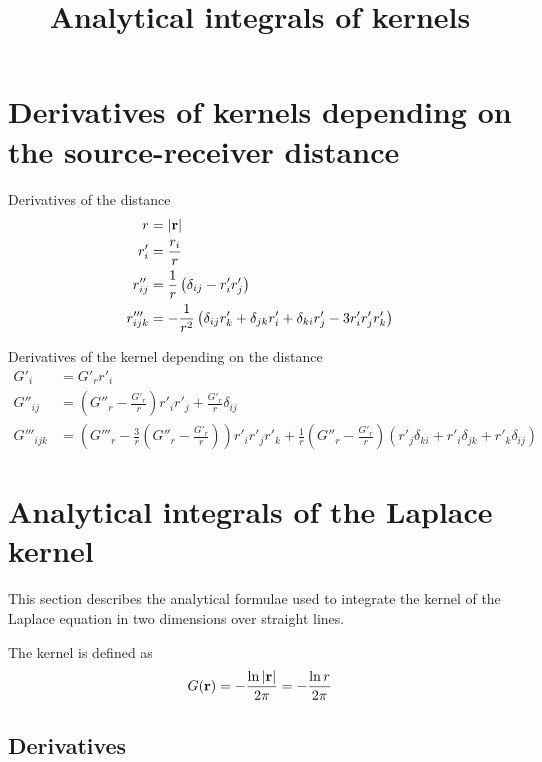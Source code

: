 \documentclass[a4paper,11pt]{article}
\title {Analytical integrals of kernels}
\begin{document}
\maketitle

\tableofcontents

\section{Derivatives of kernels depending on the source-receiver distance}

Derivatives of the distance
%
\begin{align}
	r &= |{\bf r}| \\
	r'_i &= \frac{r_i}{r} \\
	r''_{ij} &= \frac{1}{r} \left( \delta_{ij} - r'_i r'_j \right) \\
	r'''_{ijk} &= -\frac{1}{r^2} \left(
		\delta_{ij} r'_k + \delta_{jk} r'_i + \delta_{ki} r'_j - 3 r'_i r'_j r'_k
	\right)
\end{align}

Derivatives of the kernel depending on the distance
%
\begin{align}
	G'_i &= G'_r r'_i \\
	G''_{ij} &= \left(G''_r - \frac{G'_r}{r} \right) r'_i r'_j +  \frac{G'_r}{r} \delta_{ij} \\
	G'''_{ijk} &=
	\left(G'''_r -\frac{3}{r} \left(G''_r  - \frac{G'_r}{r} \right) \right) r'_i r'_j r'_k
	+  \frac{1}{r} \left( G''_r  - \frac{G'_r}{r} \right)\left(
	   r'_j \delta_{ki}
	+  r'_i \delta_{jk}
	+  r'_k \delta_{ij}
	\right)
\end{align}

\section{Analytical integrals of the Laplace kernel}

This section describes the analytical formulae used to integrate the kernel of the Laplace equation in two dimensions over straight lines.

The kernel is defined as
%
\begin{equation}
	G({\bf r}) = -\frac{\ln |{\bf r}|}{2\pi} = -\frac{\ln r}{2\pi}
\end{equation}

\subsection{Derivatives}
\end{document}
